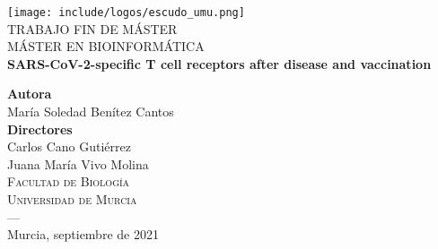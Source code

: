 \begin{titlepage}


\newlength{\centeroffset}
\setlength{\centeroffset}{-0.5\oddsidemargin}
\addtolength{\centeroffset}{0.5\evensidemargin}
\thispagestyle{empty}

\noindent\hspace*{\centeroffset}\begin{minipage}{\textwidth}

\centering
\texttt{[image: include/logos/escudo\_umu.png]}\\[1.4cm]

\textsc{ \Large TRABAJO FIN DE MÁSTER\\[0.2cm]}
\textsc{ MÁSTER EN BIOINFORMÁTICA}\\[1cm]
%
{\Huge\bfseries SARS-CoV-2-specific T cell receptors after disease and vaccination\\
}
\end{minipage}

\vspace{2.5cm}
\noindent\hspace*{\centeroffset}\begin{minipage}{\textwidth}
\centering

\textbf{Autora}\\ {María Soledad Benítez Cantos}\\[2.5ex]
\textbf{Directores}\\
{Carlos Cano Gutiérrez\\
Juana María Vivo Molina}\\[5cm]
\textsc{Facultad de Biología}\\
\textsc{Universidad de Murcia}\\
\textsc{---}\\
Murcia, septiembre de 2021
\end{minipage}
\end{titlepage}

